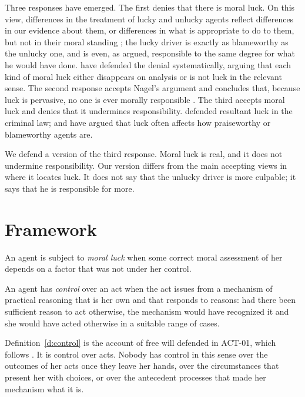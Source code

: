 \documentclass{situationist-preprint}
\begin{document}
Three responses have emerged. The first denies that there is moral luck. On this view, differences in the treatment of lucky and unlucky agents reflect differences in our evidence about them, or differences in what is appropriate to do to them, but not in their moral standing \citep{Richards1986}; the lucky driver is exactly as blameworthy as the unlucky one, and is even, as \citet{Zimmerman1987} argued, responsible to the same degree for what he would have done. \citet{EnochMarmor2007} have defended the denial systematically, arguing that each kind of moral luck either disappears on analysis or is not luck in the relevant sense. The second response accepts Nagel's argument and concludes that, because luck is pervasive, no one is ever morally responsible \citep{Levy2011}. The third accepts moral luck and denies that it undermines responsibility. \citet{Moore1997} defended resultant luck in the criminal law; \citet{Hanna2014} and \citet{Hartman2017} have argued that luck often affects how praiseworthy or blameworthy agents are.

We defend a version of the third response. Moral luck is real, and it does not undermine responsibility. Our version differs from the main accepting views in where it locates luck. It does not say that the unlucky driver is more culpable; it says that he is responsible for more.

\section{Framework}

\begin{definition}\label{d:luck}
An agent is subject to \emph{moral luck} when some correct moral assessment of her depends on a factor that was not under her control.
\end{definition}

\begin{definition}[Control]\label{d:control}
An agent has \emph{control} over an act when the act issues from a mechanism of practical reasoning that is her own and that responds to reasons: had there been sufficient reason to act otherwise, the mechanism would have recognized it and she would have acted otherwise in a suitable range of cases.
\end{definition}

Definition~\ref{d:control} is the account of free will defended in ACT-01, which follows \citet{FischerRavizza1998}. It is control over acts. Nobody has control in this sense over the outcomes of her acts once they leave her hands, over the circumstances that present her with choices, or over the antecedent processes that made her mechanism what it is.
\end{document}
